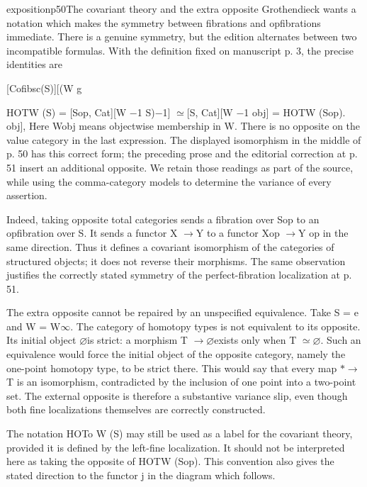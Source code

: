 \begin{dcomment}{exposition}{p50}{The covariant theory and the extra opposite}
Grothendieck wants a notation which makes the symmetry between fibrations and opfibrations immediate. There is a genuine symmetry, but the edition alternates between two incompatible formulas. With the definition fixed on manuscript p. 3, the precise identities are

[Cofibsc(S)][(W g

HOTW (S) = [Sop, Cat][W \ensuremath{-}1 S)\ensuremath{-}1] \ensuremath{\simeq}[S, Cat][W \ensuremath{-}1 obj] = HOTW (Sop). obj], Here Wobj means objectwise membership in W. There is no opposite on the value category in the last expression. The displayed isomorphism in the middle of p. 50 has this correct form; the preceding prose and the editorial correction at p. 51 insert an additional opposite. We retain those readings as part of the source, while using the comma-category models to determine the variance of every assertion.

Indeed, taking opposite total categories sends a fibration over Sop to an opfibration over S. It sends a functor X \ensuremath{\to}Y to a functor Xop \ensuremath{\to}Y op in the same direction. Thus it defines a covariant isomorphism of the categories of structured objects; it does not reverse their morphisms. The same observation justifies the correctly stated symmetry of the perfect-fibration localization at p. 51.

The extra opposite cannot be repaired by an unspecified equivalence. Take S = e and W = W\ensuremath{\infty}. The category of homotopy types is not equivalent to its opposite. Its initial object \ensuremath{\varnothing}is strict: a morphism T \ensuremath{\to}\ensuremath{\varnothing}exists only when T \ensuremath{\simeq}\ensuremath{\varnothing}. Such an equivalence would force the initial object of the opposite category, namely the one-point homotopy type, to be strict there. This would say that every map \ensuremath{*}\ensuremath{\to}T is an isomorphism, contradicted by the inclusion of one point into a two-point set. The external opposite is therefore a substantive variance slip, even though both fine localizations themselves are correctly constructed.

The notation HOTo W (S) may still be used as a label for the covariant theory, provided it is defined by the left-fine localization. It should not be interpreted here as taking the opposite of HOTW (Sop). This convention also gives the stated direction to the functor j in the diagram which follows.

\end{dcomment}

